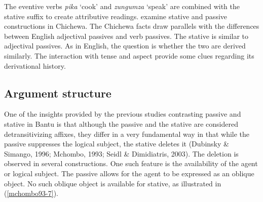 \documentclass[output=paper]{langscibook}
\begin{document}
\begin{exe}
\ex\label{sd03}{
\begin{xlist}
\end{xlist}
}
\end{exe}
The eventive verbs \textit{pika} `cook' and \textit{zungumza} `speak' are combined with the stative suffix to create attributive readings. \citet{Dubinsky:1996aa} examine stative and passive constructions in Chichewa. The Chichewa facts draw parallels with the differences between English adjectival passives and verb passives. The stative is similar to adjectival passives. As in English, the question is whether the two are derived similarly. The interaction with tense and aspect provide some clues regarding its derivational history. 

\subsection{Argument structure}
One of the insights provided by the previous studies contrasting passive and stative in Bantu is that although the passive and the stative are considered detransitivizing affixes, they differ in a very fundamental way in that while the passive suppresses the logical subject, the stative deletes it (Dubinsky \& Simango, 1996; Mchombo, 1993; Seidl \& Dimidiatris, 2003). The deletion is observed in several constructions. One such feature is the availability of the agent or logical subject. The passive allows for the agent to be expressed as an oblique object. No such oblique object is available for stative, as illustrated in (\ref{mchombo93-7}).
\end{document}

